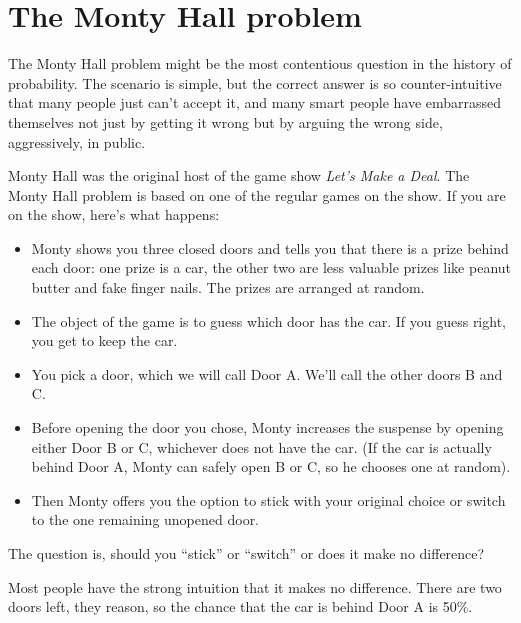 \documentclass[12pt]{book}
\begin{document}
\section{The Monty Hall problem}

The Monty Hall problem might be the most contentious question in
the history of probability.  The scenario is simple, but the correct
answer is so counter-intuitive that many people just can't accept
it, and many smart people have embarrassed themselves not just by
getting it wrong but by arguing the wrong side, aggressively,
in public.

Monty Hall was the original host of the game show {\em Let's Make a
Deal}.  The Monty Hall problem is based on one of the regular
games on the show.  If you are on the show, here's what happens:

\begin{itemize}

\item Monty shows you three closed doors and tells you that there is a
  prize behind each door: one prize is a car, the other two are less
  valuable prizes like peanut butter and fake finger nails.  The
  prizes are arranged at random.

\item The object of the game is to guess which door has the car.  If
  you guess right, you get to keep the car.

\item You pick a door, which we will call Door A.  We'll call the
  other doors B and C.

\item Before opening the door you chose, Monty increases the
  suspense by opening either Door B or C, whichever does not
  have the car.  (If the car is actually behind Door A, Monty can
  safely open B or C, so he chooses one at random).

\item Then Monty offers you the option to stick with your original
  choice or switch to the one remaining unopened door.

\end{itemize}

The question is, should you ``stick'' or ``switch'' or does it
make no difference?

Most people have the strong intuition that it makes no difference.
There are two doors left, they reason, so the chance that the car
is behind Door A is 50\%.
\end{document}
